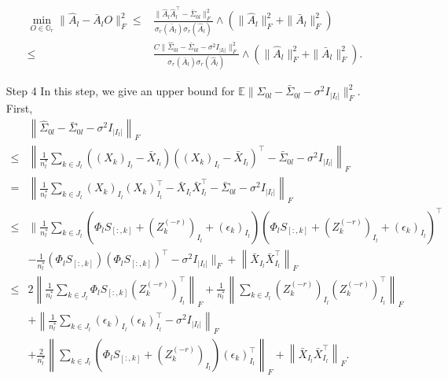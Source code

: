 \documentclass[11pt]{article}
\newcommand{\0}{{\mathbf{0}}}
\newcommand{\1}{{\mathbf{1}}}
\begin{document}
\begin{enumerate}[leftmargin=*]
	\begin{equation}\label{ineq:Step3-2}
	\begin{split}
	\min_{O\in \mathbb{O}_r} \|\hat{A}_l - \bar{A}_lO\|_F^2 \leq & \frac{\|\hat{A}_l\hat{A}_l^\top - \bar{\Sigma}_{0l} \|_F^2}{\sigma_r(\bar{A}_l)\sigma_r(\hat{A}_l)} \wedge \left(\|\hat{A}_l\|_F^2 + \|\bar{A}_l\|_F^2\right)\\
	\leq & \frac{C\|\hat{\Sigma}_{0l} - \bar{\Sigma}_{0l} - \sigma^2I_{|I_l|}\|_F^2}{\sigma_r(\bar{A}_l)\sigma_r(\hat{A}_l)} \wedge \left(\|\hat{A}_l\|_F^2 + \|\bar{A}_l\|_F^2\right).
	\end{split}
	\end{equation}
	\item[Step 4] In this step, we give an upper bound for $\mathbb{E}\|\hat{\Sigma}_{0l} - \bar{\Sigma}_{0l} - \sigma^2 I_{|I_l|}\|_F^2$. First,
	\begin{equation*}
	\begin{split}
	& \left\|\hat{\Sigma}_{0l} - \bar{\Sigma}_{0l} - \sigma^2I_{|I_l|}\right\|_F \\
	\leq & \left\|\frac{1}{n_l^\ast}\sum_{k\in J_l}\left((X_k)_{I_l} - \bar{X}_{I_l}\right)\left((X_k)_{I_l} - \bar{X}_{I_l}\right)^\top - \bar{\Sigma}_{0l} - \sigma^2I_{|I_l|}\right\|_F\\
	= & \left\|\frac{1}{n_l^\ast}\sum_{k\in J_l} (X_k)_{I_l} (X_k)_{I_l}^\top - \bar{X}_{I_l}\bar{X}_{I_l}^\top - \bar{\Sigma}_{0l} - \sigma^2I_{|I_l|}\right\|_F \\
	\leq & \Bigg\|\frac{1}{n_l^\ast} \sum_{k \in J_l}\left(\Phi_l S_{[:, k]}+ (Z_k^{(-r)})_{I_l} + (\epsilon_k)_{I_l}\right)\left(\Phi_l S_{[:, k]} + (Z_k^{(-r)})_{I_l} + (\epsilon_k)_{I_l}\right)^\top \\
	& - \frac{1}{n_l^\ast}(\Phi_l S_{[:, k]})(\Phi_l S_{[:, k]})^\top  - \sigma^2I_{|I_l|}\Bigg\|_F  + \left\|\bar{X}_{I_l}\bar{X}_{I_l}^\top\right\|_F\\
	\leq & 2\left\|\frac{1}{n_l^\ast}\sum_{k \in J_l}\Phi_l S_{[:,k]} (Z^{(-r)}_k)_{I_l}^\top\right\|_F + \frac{1}{n_l^\ast}\left\|\sum_{k\in J_l}(Z_k^{(-r)})_{I_l}(Z^{(-r)}_k)_{I_l}^\top\right\|_F \\
	& + \left\|\frac{1}{n_l^\ast}\sum_{k \in J_l} (\epsilon_k)_{I_l}(\epsilon_k)_{I_l}^\top - \sigma^2 I_{|I_l|} \right\|_F\\
	& + \frac{2}{n_l^\ast}\left\|\sum_{k\in J_l}\left(\Phi_l S_{[:,k]} + (Z_k^{(-r)})_{I_l}\right) (\epsilon_k)_{I_l}^\top\right\|_F +  \left\|\bar{X}_{I_l}\bar{X}_{I_l}^\top\right\|_F.
	\end{split}

\end{equation*}
\end{enumerate}
\end{document}

